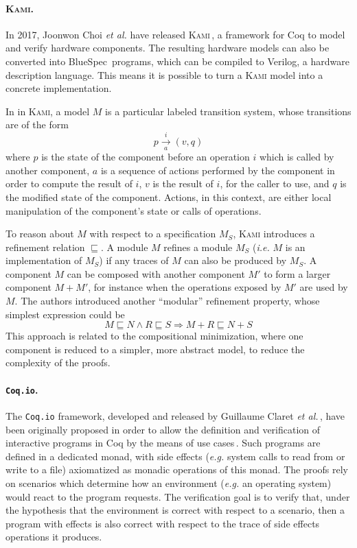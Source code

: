 \paragraph{{\scshape Kami}.}
%
In 2017, Joonwon Choi \emph{et al.} have released {\scshape
  Kami}\,\cite{choi2017kami}, a framework for Coq to model and verify hardware
components.
%
The resulting hardware models can also be converted into
BlueSpec\,\cite{nikhil2004bluespec} programs, which can be compiled to Verilog,
a hardware description language.
%
This means it is possible to turn a {\scshape Kami} model into a concrete
implementation.

In in {\scshape Kami}, a model \( M \) is a particular labeled transition
system, whose transitions are of the form
%
\[
  p \xrightarrow[a]{i} (v, q)
\]
%
where \( p \) is the state of the component before an operation \( i \) which is
called by another component, \( a \) is a sequence of actions performed by the
component in order to compute the result of \( i \), \( v \) is the result of
\( i \), for the caller to use, and \( q \) is the modified state of the
component.
%
Actions, in this context, are either local manipulation of the component's state
or calls of operations.

To reason about \( M \) with respect to a specification \( M_S \), {\scshape
  Kami} introduces a refinement relation \( \sqsubseteq \).
%
A module \( M \) refines a module \( M_S \) (\emph{i.e.} \( M \) is an
implementation of \( M_S \)) if any traces of \( M \) can also be produced by
\( M_S \).
%
A component \( M \) can be composed with another component \( M' \) to form a
larger component \( M + M' \), for instance when the operations exposed by
\( M' \) are used by \( M \).
%
The authors introduced another ``modular'' refinement property, whose simplest
expression could be
%
\[
  M \sqsubseteq N \wedge R \sqsubseteq S \Rightarrow M + R \sqsubseteq N + S
\]
%
This approach is related to the compositional minimization, where one component
is reduced to a simpler, more abstract model, to reduce the complexity of the
proofs.

\paragraph{\texttt{Coq.io}.}
%
The \texttt{Coq.io} framework, developed and released by Guillaume Claret
\emph{et al.}\,\cite{claret2015coqiowww}, have been originally proposed in order
to allow the definition and verification of interactive programs in Coq by the
means of use cases\,\cite{claret2015coqio}.
%
Such programs are defined in a dedicated monad, with side effects (\emph{e.g.}
system calls to read from or write to a file) axiomatized as monadic operations
of this monad.
%
The proofs rely on scenarios which determine how an environment (\emph{e.g.} an
operating system) would react to the program requests.
%
The verification goal is to verify that, under the hypothesis that the
environment is correct with respect to a scenario, then a program with effects
is also correct with respect to the trace of side effects operations it
produces.

